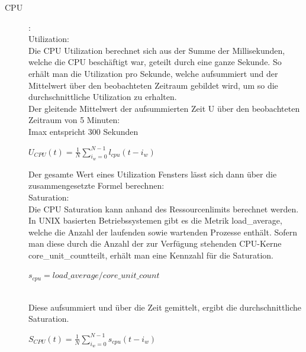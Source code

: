 \documentclass[a4paper,10pt]{scrartcl}
\begin{document}
\begin{description}
\item[CPU]:\\
Utilization:\\
Die CPU Utilization berechnet sich aus der Summe der Millisekunden, welche die CPU beschäftigt war, geteilt durch eine ganze Sekunde. So erhält man die Utilization pro Sekunde, welche aufsummiert und der Mittelwert über den beobachteten Zeitraum gebildet wird, um so die durchschnittliche Utilization zu erhalten.\\

Der gleitende Mittelwert der aufsummierten Zeit U über den beobachteten Zeitraum von 5 Minuten:\\
Imax entspricht 300 Sekunden

\begin{minipage}{\linewidth}
\(
\displaystyle{U_{CPU}(t)=\frac{1}{N}{\sum\limits_{i_{w}=0}^{N-1} l_{cpu}{(t-i_{w})}} }
\)


\end{minipage}

Der gesamte Wert eines Utilization Fensters lässt sich dann über die zusammengesetzte Formel berechnen:\\

Saturation:\\
Die CPU Saturation kann anhand des Ressourcenlimits berechnet werden. In UNIX basierten Betriebssystemen gibt es die Metrik \glqq load\_average\grqq, welche die Anzahl der laufenden sowie wartenden Prozesse enthält. Sofern man diese durch die Anzahl der zur Verfügung stehenden CPU-Kerne \glqq core\_unit\_count\grqq teilt, erhält man eine Kennzahl für die Saturation.\\

\begin{minipage}{\linewidth}
\(
\displaystyle{s_{cpu}= load\_average / core\_unit\_count}
\)

\end{minipage}\\

Diese aufsummiert und über die Zeit gemittelt, ergibt die durchschnittliche Saturation.\\

\begin{minipage}{\linewidth}
\(
\displaystyle{S_{CPU}(t)=\frac{1}{N}{\sum\limits_{i_{w}=0}^{N-1} s_{cpu}{(t-i_{w})}} }
\)


\end{minipage}
\end{description}
\end{document}
